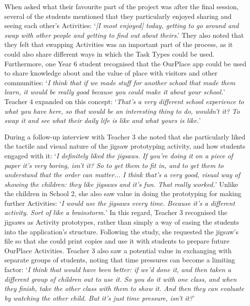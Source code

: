 \documentclass[,hyphens]{sigchi}
\begin{document}
When asked what their favourite part of the project was after the final session, several of the students mentioned that they particularly enjoyed sharing and seeing each other's Activities: `\textit{[I most enjoyed] today, getting to go around and swap with other people and getting to find out about theirs}.' They also noted that they felt that swapping Activities was an important part of the process, as it could also share different ways in which the Task Types could be used. Furthermore, one Year 6 student recognised that the OurPlace app could be used to share knowledge about and the value of place with visitors and other communities: `\textit{I think that if we made stuff for another school that made them learn, it would be really good because you could make it about your school.}' Teacher 4 expanded on this concept: `\textit{That's a very different school experience to what you have here, so that would be an interesting thing to do, wouldn't it? To swap it and see what their daily life is like and what yours is like.}' 

During a follow-up interview with Teacher 3 she noted that she particularly liked the tactile and visual nature of the jigsaw prototyping activity, and how students engaged with it: `\textit{I definitely liked the jigsaws. If you're doing it on a piece of paper it's very boring, isn't it? So to get them to fit in, and to get them to understand that the order can matter... I think that's a very good, visual way of showing the children: they like jigsaws and it's fun. That really worked.}' Unlike the children in School 2, she also saw value in doing the prototyping for making further Activities: `\textit{I would use the jigsaws every time. Because it's a different activity. Sort of like a brainstorm.}' In this regard, Teacher 3 recognised the jigsaws as Activity prototypes, rather than simply a way of easing the students into the application's structure. Following the study, she requested the jigsaw's file so that she could print copies and use it with students to prepare future OurPlace Activities. Teacher 3 also saw a potential value in exchanging with separate groups of students, noting that time pressures can become a limiting factor: `\textit{I think that would have been better: if we'd done it, and then taken a different group of children out to use it. So you do it with one class, and when they finish, take the other class with them to show it. And then they can evaluate by watching the other child. But it's just time pressure, isn't it?}'
\end{document}
